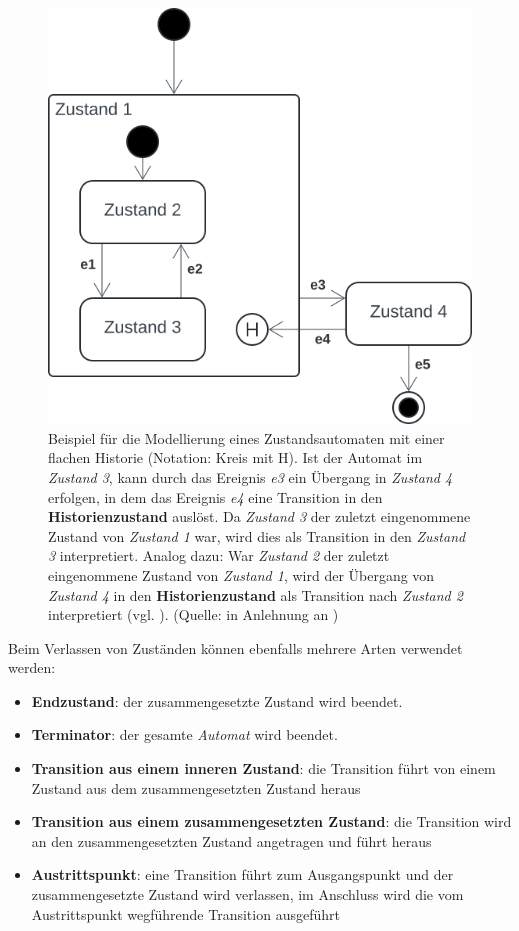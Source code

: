 \begin{figure}
    \centering
    \includegraphics[scale=0.4]{part three/Zustandsautomaten/img/flachehistorie}
    \caption{Beispiel für die Modellierung eines Zustandsautomaten mit einer flachen Historie (Notation: Kreis mit H). Ist der Automat im \textit{Zustand 3}, kann durch das Ereignis \textit{e3} ein Übergang in \textit{Zustand 4} erfolgen, in dem das Ereignis \textit{e4} eine Transition in den \textbf{Historienzustand} auslöst. Da \textit{Zustand 3} der zuletzt eingenommene Zustand von \textit{Zustand 1} war, wird dies als Transition in den \textit{Zustand 3} interpretiert. Analog dazu: War \textit{Zustand 2} der zuletzt eingenommene Zustand von \textit{Zustand 1}, wird der Übergang von \textit{Zustand 4} in den \textbf{Historienzustand} als Transition nach \textit{Zustand 2} interpretiert (vgl. \cite[341 f.]{Bal05}). (Quelle: in Anlehnung an \cite[342, Abb. 6.11-6]{Bal05})}
    \label{fig:flachehistorie}
\end{figure}


\noindent
Beim Verlassen von Zuständen können ebenfalls mehrere Arten verwendet werden:

\begin{itemize}
    \item \textbf{Endzustand}: der zusammengesetzte Zustand wird beendet.
    \item \textbf{Terminator}: der gesamte \textit{Automat} wird beendet.
    \item \textbf{Transition aus einem inneren Zustand}: die Transition führt von einem Zustand aus dem zusammengesetzten Zustand heraus
    \item \textbf{Transition aus einem zusammengesetzten Zustand}: die Transition wird an den zusammengesetzten Zustand angetragen und führt heraus
    \item \textbf{Austrittspunkt}: eine Transition führt zum Ausgangspunkt und der zusammengesetzte Zustand wird verlassen, im Anschluss wird die vom Austrittspunkt wegführende Transition ausgeführt
\end{itemize}


